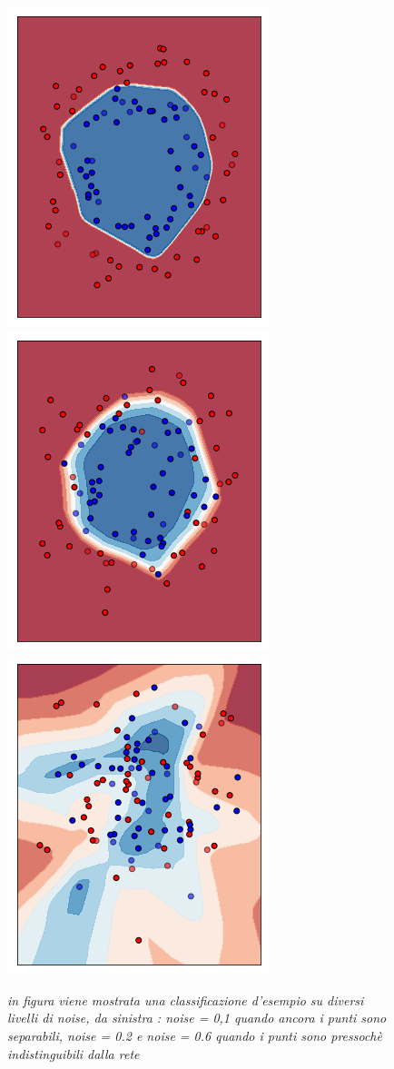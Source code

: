 \documentclass[12pt,a4paper]{report}
\begin{document}
\begin{figure}[H]
 \centering
 \includegraphics[scale = 0.4]{images/circles-noise0,1.png}
 \includegraphics[scale = 0.4]{images/circles-noise0,2.png}
 \includegraphics[scale = 0.4]{images/circles-noise0,6.png}
 \caption{\textit{in figura viene mostrata una classificazione d'esempio su diversi livelli di noise, da sinistra : noise = 0,1 quando ancora i punti sono separabili, noise = 0.2 e noise = 0.6 quando i punti sono pressochè indistinguibili dalla rete}}
 \label{exnoisecircles}
\end{figure}
\end{document}
